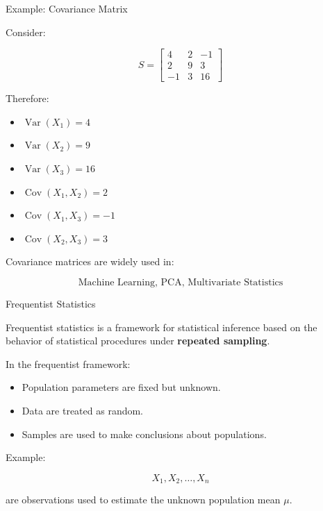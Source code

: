 \documentclass[aspectratio=169]{beamer}
\begin{document}
\begin{frame}{Example: Covariance Matrix}

Consider:

\[
S=
\begin{bmatrix}
4 & 2 & -1\\
2 & 9 & 3\\
-1 & 3 & 16
\end{bmatrix}
\]

Therefore:

\begin{itemize}
    \item $\operatorname{Var}(X_1)=4$
    \item $\operatorname{Var}(X_2)=9$
    \item $\operatorname{Var}(X_3)=16$
    \item $\operatorname{Cov}(X_1,X_2)=2$
    \item $\operatorname{Cov}(X_1,X_3)=-1$
    \item $\operatorname{Cov}(X_2,X_3)=3$
\end{itemize}

Covariance matrices are widely used in:

\[
\boxed{\text{Machine Learning, PCA, Multivariate Statistics}}
\]
\end{frame}

\begin{frame}{Frequentist Statistics}

Frequentist statistics is a framework for statistical inference
based on the behavior of statistical procedures under
\textbf{repeated sampling}.

In the frequentist framework:

\begin{itemize}
    \item Population parameters are fixed but unknown.
    \item Data are treated as random.
    \item Samples are used to make conclusions about populations.
\end{itemize}

Example:

\[
X_1,X_2,\ldots,X_n
\]

are observations used to estimate the unknown population mean $\mu$.
\end{frame}
\end{document}
